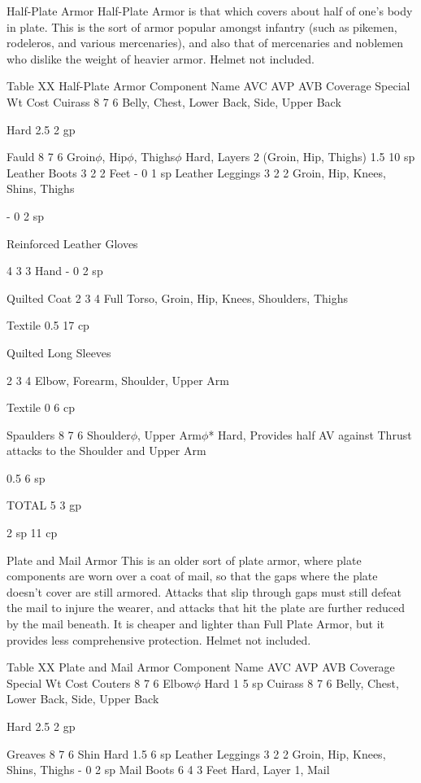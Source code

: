\documentclass[oneside,11pt,english]{book}
\begin{document}
Half-Plate Armor 
Half-Plate Armor is that which covers about half of one's body in plate. This is the sort of armor popular 
amongst infantry (such as pikemen, rodeleros, and various mercenaries), and also that of mercenaries and 
noblemen who dislike the weight of heavier armor. Helmet not included. 

 
Table XX Half-Plate Armor 
Component Name AVC AVP AVB Coverage Special Wt Cost 
Cuirass 8 7 6 Belly, Chest, Lower Back, 
Side, Upper Back 

Hard 2.5 2 gp 

Fauld 8 7 6 Groin$\phi$, Hip$\phi$, Thighs$\phi$ Hard, Layers 2 (Groin, Hip, Thighs) 1.5 10 
sp 
Leather Boots 3 2 2 Feet - 0 1 sp 
Leather Leggings 3 2 2 Groin, Hip, Knees, Shins, 
Thighs 

- 0 2 sp 

Reinforced 
Leather Gloves 

4 3 3 Hand - 0 2 sp 

Quilted Coat 2 3 4 Full Torso, Groin, Hip, 
Knees, Shoulders, Thighs 

Textile 0.5 17 
cp 

Quilted Long 
Sleeves 

2 3 4 Elbow, Forearm, Shoulder, 
Upper Arm 

Textile 0 6 cp 

Spaulders 8 7 6 Shoulder$\phi$, Upper Arm$\phi$* Hard, Provides half AV against 
Thrust attacks to the Shoulder and 
Upper Arm 

0.5 6 sp 

TOTAL 5 3 gp 


2 sp 
11 
cp 

 

Plate and Mail Armor 
This is an older sort of plate armor, where plate components are worn over a coat of mail, so that the gaps 
where the plate doesn’t cover are still armored. Attacks that slip through gaps must still defeat the mail to 
injure the wearer, and attacks that hit the plate are further reduced by the mail beneath. It is cheaper and 
lighter than Full Plate Armor, but it provides less comprehensive protection. Helmet not included. 

 
Table XX Plate and Mail Armor 
Component Name AVC AVP AVB Coverage Special Wt Cost 
Couters 8 7 6 Elbow$\phi$ Hard 1 5 sp 
Cuirass 8 7 6 Belly, Chest, Lower Back, Side, Upper 
Back 

Hard 2.5 2 gp 

Greaves 8 7 6 Shin Hard 1.5 6 sp 
Leather Leggings 3 2 2 Groin, Hip, Knees, Shins, Thighs - 0 2 sp 
Mail Boots 6 4 3 Feet Hard, Layer 1, 
Mail 
\end{document}
